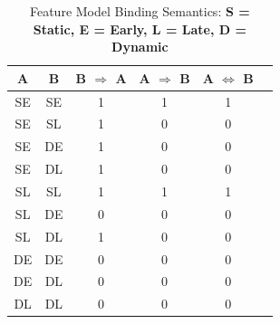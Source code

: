 \documentclass[conference]{IEEEtran}
\begin{document}
\begin{table}[H]
\caption{Feature Model Binding Semantics: \textbf{S = Static, E = Early, L = Late, D = Dynamic}}
\begin{center}
\begin{tabular}{|c|c|c|c|c|c|}
\hline
    A & B & B $ \Rightarrow $ A & A $ \Rightarrow $ B & A $ \Leftrightarrow $ B \\\hline
         SE & SE & 1 & 1 & 1  \\ \hline
         SE & SL & 1 & 0 & 0  \\ \hline
         SE & DE & 1 & 0 & 0 \\ \hline
         SE & DL & 1 & 0 & 0 \\ \hline
          
         SL & SL & 1 & 1 & 1 \\ \hline
         SL & DE & 0 & 0 & 0 \\ \hline
         SL & DL & 1 & 0 & 0 \\ \hline
         
         DE & DE & 0 & 0 & 0 \\ \hline
         DE & DL & 0 & 0 & 0 \\ \hline
         
         DL & DL & 0 & 0 & 0 \\ \hline
         
\end{tabular}
\label{tab:timoconf}
\end{center}
\end{table}
\end{document}
